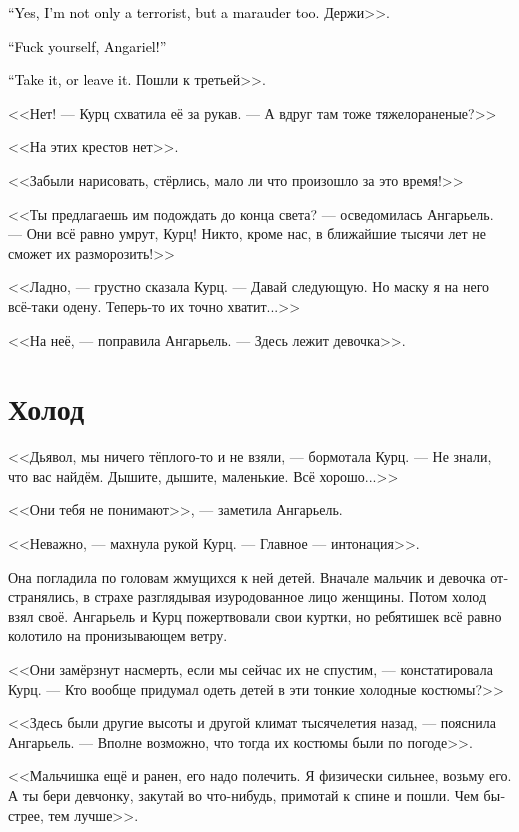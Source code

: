 \documentclass[a4paper,12pt,fleqn]{book}\usepackage{cooltooltips}\usepackage{polyglossia}\setdefaultlanguage[babelshorthands=true]{russian}\setotherlanguage{english}\defaultfontfeatures{Ligatures=TeX,Mapping=tex-text} \usepackage{xcolor}\definecolor{lightgray}{HTML}{bbbbbb}\color{lightgray}\newcommand{\ml}[3]{\textenglish{\textcolor{black}{#3}}}
\begin{document}
\ml{$0$}
{<<Да, я не только террористка, но ещё и мародёрка.}
{``Yes, I'm not only a terrorist, but a marauder too.}
Держи>>.

\ml{$0$}
{<<Иди ты к дьяволу, Ангарьель!>>}
{``Fuck yourself, Angariel!''}

\ml{$0$}
{<<Не хочешь --- не надо.}
{``Take it, or leave it.}
Пошли к третьей>>.

<<Нет! --- Курц схватила её за рукав.
--- А вдруг там тоже тяжелораненые?>>

<<На этих крестов нет>>.

<<Забыли нарисовать, стёрлись, мало ли что произошло за это время!>>

<<Ты предлагаешь им подождать до конца света? --- осведомилась Ангарьель.
--- Они всё равно умрут, Курц!
Никто, кроме нас, в ближайшие тысячи лет не сможет их разморозить!>>

<<Ладно, --- грустно сказала Курц.
--- Давай следующую.
Но маску я на него всё-таки одену.
Теперь-то их точно хватит...>>

<<На неё, --- поправила Ангарьель.
--- Здесь лежит девочка>>.

\section{Холод}

<<Дьявол, мы ничего тёплого-то и не взяли, --- бормотала Курц.
--- Не знали, что вас найдём.
Дышите, дышите, маленькие.
Всё хорошо...>>

<<Они тебя не понимают>>, --- заметила Ангарьель.

<<Неважно, --- махнула рукой Курц.
--- Главное --- интонация>>.

Она погладила по головам жмущихся к ней детей.
Вначале мальчик и девочка отстранялись, в страхе разглядывая изуродованное лицо женщины.
Потом холод взял своё.
Ангарьель и Курц пожертвовали свои куртки, но ребятишек всё равно колотило на пронизывающем ветру.

<<Они замёрзнут насмерть, если мы сейчас их не спустим, --- констатировала Курц.
--- Кто вообще придумал одеть детей в эти тонкие холодные костюмы?>>

<<Здесь были другие высоты и другой климат тысячелетия назад, --- пояснила Ангарьель.
--- Вполне возможно, что тогда их костюмы были по погоде>>.

<<Мальчишка ещё и ранен, его надо полечить.
Я физически сильнее, возьму его.
А ты бери девчонку, закутай во что-нибудь, примотай к спине и пошли.
Чем быстрее, тем лучше>>.
\end{document}
